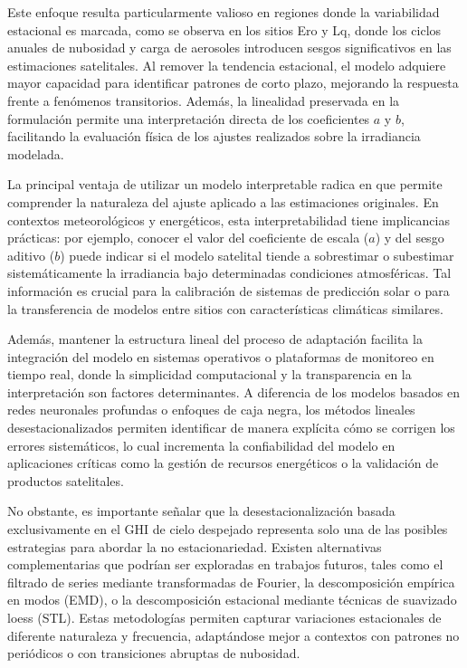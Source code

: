 Este enfoque resulta particularmente valioso en regiones donde la variabilidad estacional es marcada, como se observa en los sitios Ero y Lq, donde los ciclos anuales de nubosidad y carga de aerosoles introducen sesgos significativos en las estimaciones satelitales. Al remover la tendencia estacional, el modelo adquiere mayor capacidad para identificar patrones de corto plazo, mejorando la respuesta frente a fenómenos transitorios. Además, la linealidad preservada en la formulación permite una interpretación directa de los coeficientes $a$ y $b$, facilitando la evaluación física de los ajustes realizados sobre la irradiancia modelada.

La principal ventaja de utilizar un modelo interpretable radica en que permite comprender la naturaleza del ajuste aplicado a las estimaciones originales. En contextos meteorológicos y energéticos, esta interpretabilidad tiene implicancias prácticas: por ejemplo, conocer el valor del coeficiente de escala ($a$) y del sesgo aditivo ($b$) puede indicar si el modelo satelital tiende a sobrestimar o subestimar sistemáticamente la irradiancia bajo determinadas condiciones atmosféricas. Tal información es crucial para la calibración de sistemas de predicción solar o para la transferencia de modelos entre sitios con características climáticas similares.

Además, mantener la estructura lineal del proceso de adaptación facilita la integración del modelo en sistemas operativos o plataformas de monitoreo en tiempo real, donde la simplicidad computacional y la transparencia en la interpretación son factores determinantes. A diferencia de los modelos basados en redes neuronales profundas o enfoques de caja negra, los métodos lineales desestacionalizados permiten identificar de manera explícita cómo se corrigen los errores sistemáticos, lo cual incrementa la confiabilidad del modelo en aplicaciones críticas como la gestión de recursos energéticos o la validación de productos satelitales.

No obstante, es importante señalar que la desestacionalización basada exclusivamente en el GHI de cielo despejado representa solo una de las posibles estrategias para abordar la no estacionariedad. Existen alternativas complementarias que podrían ser exploradas en trabajos futuros, tales como el filtrado de series mediante transformadas de Fourier, la descomposición empírica en modos (EMD), o la descomposición estacional mediante técnicas de suavizado loess (STL). Estas metodologías permiten capturar variaciones estacionales de diferente naturaleza y frecuencia, adaptándose mejor a contextos con patrones no periódicos o con transiciones abruptas de nubosidad.

